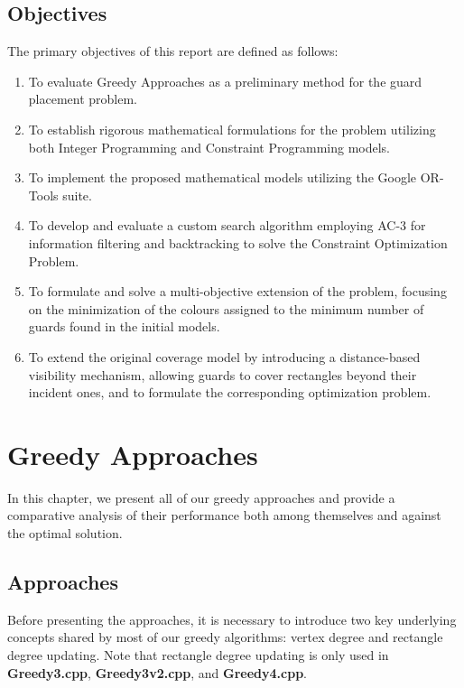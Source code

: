 \documentclass{report}
\begin{document}
\pagebreak

\section{Objectives}
The primary objectives of this report are defined as follows:

\begin{enumerate}
    \item To evaluate Greedy Approaches as a preliminary method for the guard placement problem.
    \item To establish rigorous mathematical formulations for the problem utilizing both Integer Programming and Constraint Programming models.
    \item To implement the proposed mathematical models utilizing the Google OR-Tools suite.
    \item To develop and evaluate a custom search algorithm employing AC-3 for information filtering and backtracking to solve the Constraint Optimization Problem.
    \item To formulate and solve a multi-objective extension of the problem, focusing on the minimization of the colours assigned to the minimum number of guards found in the initial models.
    \item To extend the original coverage model by introducing a distance-based visibility mechanism, allowing guards to cover rectangles beyond their incident ones, and to formulate the corresponding optimization problem.
\end{enumerate}




\chapter{Greedy Approaches}

In this chapter, we present all of our greedy approaches and provide a comparative analysis of their performance both among themselves and against the optimal solution.

\section{Approaches}

\noindent Before presenting the approaches, it is necessary to introduce two key underlying concepts shared by most of our greedy algorithms: vertex degree and rectangle degree updating. Note that rectangle degree updating is only used in \textbf{Greedy3.cpp}, \textbf{Greedy3v2.cpp}, and \textbf{Greedy4.cpp}. 
\end{document}
